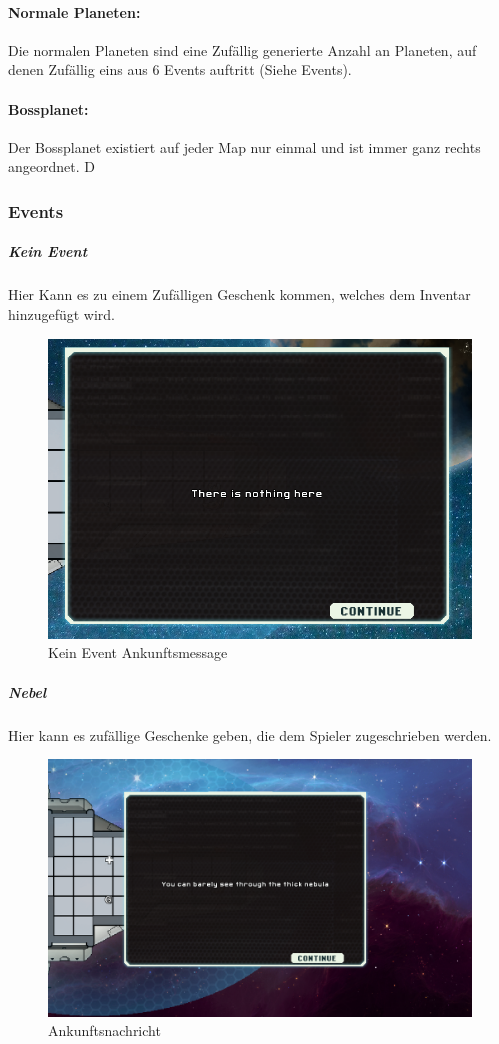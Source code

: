 \documentclass[fontsize=12pt,paper=a4,twoside]{scrartcl}
\begin{document}
\paragraph{Normale Planeten: }
Die normalen Planeten sind eine Zufällig generierte Anzahl an Planeten, auf denen Zufällig eins aus 6 Events auftritt (Siehe Events).

\paragraph{Bossplanet: }
Der Bossplanet existiert auf jeder Map nur einmal und ist immer ganz rechts angeordnet. D


\subsubsection{Events}

\subparagraph{Kein Event} Hier Kann es zu einem Zufälligen Geschenk kommen, welches dem Inventar hinzugefügt wird.

\begin{figure}[H]
\centering
\includegraphics[width=1\linewidth]{DasSpiel/Karte/nothing.png}
\caption{Kein Event Ankunftsmessage}
\end{figure}
 
\subparagraph{Nebel} Hier kann es zufällige Geschenke geben, die dem Spieler zugeschrieben werden.

\begin{figure}[H]
\centering
\includegraphics[width=0.8\linewidth]{DasSpiel/Karte/nebular.png}
\caption{Ankunftsnachricht}
\end{figure} 
\end{document}
